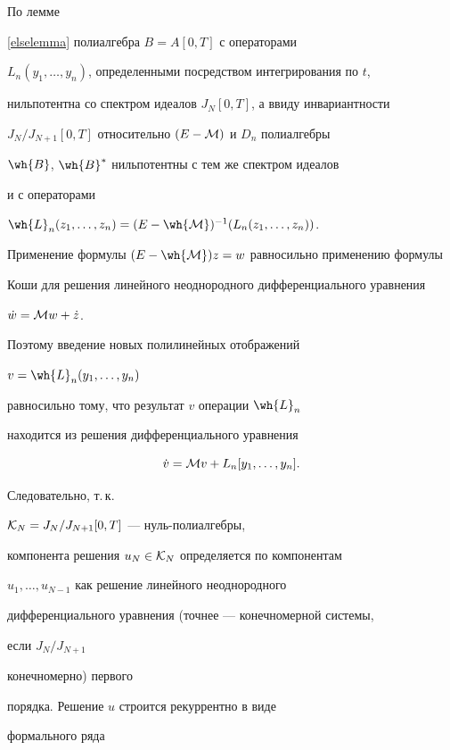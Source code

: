 \begin{pf}


По лемме


\ref{elselemma} полиалгебра $B=A[0,T]$ с операторами


$L_n(y_1,\dotsc,y_n)$, определенными посредством интегрирования по $t$,


нильпотентна со спектром идеалов $J_N[0,T]$, а ввиду инвариантности


$J_N/J_{N+1}[0,T]$ относительно $(E-{\cal{M}})$ и $D_n$ полиалгебры


$\wh{B}$, $\wh{B}^*$ нильпотентны с тем же спектром идеалов


и с операторами


$\wh{L}_n(z_1,\dotsc,z_n)=(E-\wh{\cal{M}})^{-1}(L_n(z_1,\dotsc,z_n))$.


Применение формулы $(E-{\wh{\cal{M}}})z=w$ равносильно применению формулы


Коши для решения линейного неоднородного дифференциального уравнения


$\Dot w={\cal{M}}w+\Dot z$.


Поэтому введение новых полилинейных отображений


$ v=\wh{L}_n(y_1,\dotsc,y_n)$


равносильно тому, что результат $v$ операции $\wh {L}_n$


находится из решения дифференциального уравнения


\begin{equation}


\label{linurv}


\Dot v={\cal{M}}v+ L_n[y_1,\dotsc,y_n].


\end{equation}


Следовательно, т.\,к.


${\cal{K}}_N=J_N/J_{N+1}[0,T]$ --- нуль-полиалгебры,


компонента решения $u_N\in{\cal{K}}_N$ определяется по компонентам


$u_1, \dotsc, u_{N-1}$ как решение линейного неоднородного


дифференциального уравнения (точнее --- конечномерной системы,


если $J_N/J_{N+1}$


конечномерно) первого


порядка. Решение $u$ строится рекуррентно в виде


формального ряда


$$



\end{pf}
